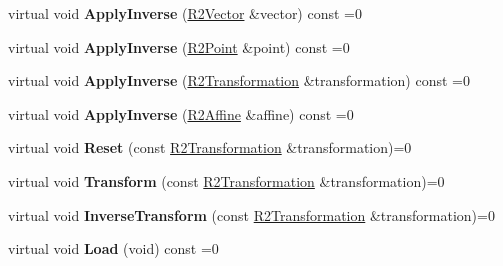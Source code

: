 \begin{DoxyCompactItemize}
\item 
virtual void {\bfseries Apply\+Inverse} (\hyperlink{class_r2_vector}{R2\+Vector} \&vector) const  =0\hypertarget{class_r2_transformation_a41519d44b1b34827b274980e3042bd17}{}\label{class_r2_transformation_a41519d44b1b34827b274980e3042bd17}

\item 
virtual void {\bfseries Apply\+Inverse} (\hyperlink{class_r2_point}{R2\+Point} \&point) const  =0\hypertarget{class_r2_transformation_a5553808b3c32d479c811e72154fde2a0}{}\label{class_r2_transformation_a5553808b3c32d479c811e72154fde2a0}

\item 
virtual void {\bfseries Apply\+Inverse} (\hyperlink{class_r2_transformation}{R2\+Transformation} \&transformation) const  =0\hypertarget{class_r2_transformation_a0fe799238277dce506ff042e5b960179}{}\label{class_r2_transformation_a0fe799238277dce506ff042e5b960179}

\item 
virtual void {\bfseries Apply\+Inverse} (\hyperlink{class_r2_affine}{R2\+Affine} \&affine) const  =0\hypertarget{class_r2_transformation_ace4b452ab83e23940069099bcb9cd82e}{}\label{class_r2_transformation_ace4b452ab83e23940069099bcb9cd82e}

\item 
virtual void {\bfseries Reset} (const \hyperlink{class_r2_transformation}{R2\+Transformation} \&transformation)=0\hypertarget{class_r2_transformation_a2642ff67f5dccb9b24248839d0531701}{}\label{class_r2_transformation_a2642ff67f5dccb9b24248839d0531701}

\item 
virtual void {\bfseries Transform} (const \hyperlink{class_r2_transformation}{R2\+Transformation} \&transformation)=0\hypertarget{class_r2_transformation_a387a684d4d558ce4c09f18c5d15f3789}{}\label{class_r2_transformation_a387a684d4d558ce4c09f18c5d15f3789}

\item 
virtual void {\bfseries Inverse\+Transform} (const \hyperlink{class_r2_transformation}{R2\+Transformation} \&transformation)=0\hypertarget{class_r2_transformation_a1799be1bca0a4031b94a4ef345167798}{}\label{class_r2_transformation_a1799be1bca0a4031b94a4ef345167798}

\item 
virtual void {\bfseries Load} (void) const  =0\hypertarget{class_r2_transformation_aea112a53f758a251bf4ad2dc5cfcb0f7}{}\label{class_r2_transformation_aea112a53f758a251bf4ad2dc5cfcb0f7}


\end{DoxyCompactItemize}
